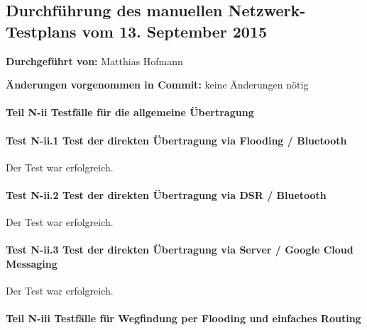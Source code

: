 \subsection{Durchführung des manuellen Netzwerk-Testplans vom 13. September 2015}

\textbf{Durchgeführt von:} Matthias Hofmann

\textbf{Änderungen vorgenommen in Commit:} keine Änderungen nötig

\paragraph{Teil N-ii Testfälle für die allgemeine Übertragung}

\paragraph{Test N-ii.1 Test der direkten Übertragung via Flooding / Bluetooth}

Der Test war erfolgreich.



\paragraph{Test N-ii.2 Test der direkten Übertragung via DSR / Bluetooth}

Der Test war erfolgreich.




\paragraph{Test N-ii.3 Test der direkten Übertragung via Server / Google Cloud Messaging}

Der Test war erfolgreich.




\paragraph{Teil N-iii Testfälle für Wegfindung per Flooding und einfaches Routing}

